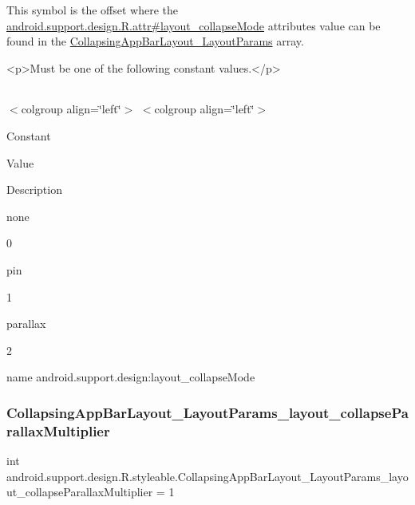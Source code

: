 This symbol is the offset where the \hyperlink{classandroid_1_1support_1_1design_1_1R_1_1attr_a7e6eee09bb81ae400b00405494ef8eba}{android.\+support.\+design.\+R.\+attr\#layout\+\_\+collapse\+Mode} attribute\textquotesingle{}s value can be found in the \hyperlink{classandroid_1_1support_1_1design_1_1R_1_1styleable_a84348eab6e616d953feaef19d531ee2f}{Collapsing\+App\+Bar\+Layout\+\_\+\+Layout\+Params} array.

\begin{DoxyVerb}      <p>Must be one of the following constant values.</p>
\end{DoxyVerb}
 \tabulinesep=1mm
\begin{longtabu} spread 0pt [c]{*{0}{|X[-1]}|}
\hline
\end{longtabu}
$<$colgroup align=\char`\"{}left\char`\"{}$>$ $<$colgroup align=\char`\"{}left\char`\"{}$>$ 

Constant

Value

Description 

{\ttfamily none}

0

{\ttfamily pin}

1

{\ttfamily parallax}

2

name android.\+support.\+design\+:layout\+\_\+collapse\+Mode \mbox{\label{classandroid_1_1support_1_1design_1_1R_1_1styleable_a811337664483530d22c06f4cbba2e69c}} 
\subsubsection{\texorpdfstring{Collapsing\+App\+Bar\+Layout\+\_\+\+Layout\+Params\+\_\+layout\+\_\+collapse\+Parallax\+Multiplier}{CollapsingAppBarLayout\_LayoutParams\_layout\_collapseParallaxMultiplier}}
{\footnotesize\ttfamily int android.\+support.\+design.\+R.\+styleable.\+Collapsing\+App\+Bar\+Layout\+\_\+\+Layout\+Params\+\_\+layout\+\_\+collapse\+Parallax\+Multiplier = 1\hspace{0.3cm}{\ttfamily [static]}}

